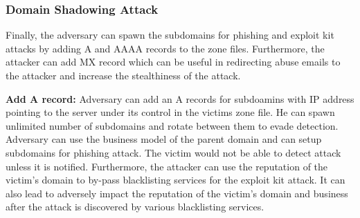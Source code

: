 





\subsubsection{Domain Shadowing Attack}

Finally, the adversary can spawn the subdomains for phishing and exploit kit attacks by adding A and AAAA records to the zone files. Furthermore, the attacker can add MX record which can be useful in redirecting abuse emails to the attacker and increase the stealthiness of the attack. 

\textbf{Add A record:} 
Adversary can add an A records for subdoamins with IP address pointing to the server under its control in the victims zone file. He can spawn unlimited number of subdomains and rotate between them to evade detection. Adversary can use the business model of the parent domain and can setup subdomains for phishing attack. The victim would not be able to detect attack unless it is notified. Furthermore, the attacker can use the reputation of the victim's domain to by-pass blacklisting services for the exploit kit attack. It can also lead to adversely impact the reputation of the victim's domain and business after the attack is discovered by various blacklisting services.

